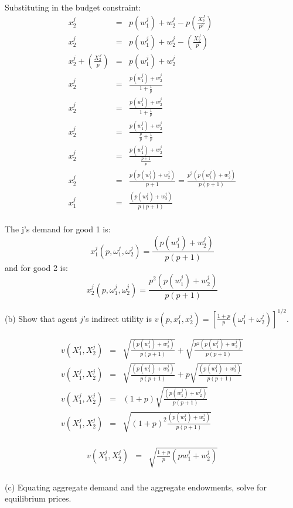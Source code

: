 Substituting in the budget constraint:
\begin{eqnarray*}
x_2^j&=&p(w_1^j)+w_2^j-p(\frac{X_2^J}{p^2})\\
x_2^j&=&p(w_1^j)+w_2^j-(\frac{X_2^J}{p})\\
x_2^j+(\frac{X_2^J}{p})&=&p(w_1^j)+w_2^j\\
x_2^j&=&\frac{p(w_1^j)+w_2^j}{1+\frac{1}{p}}\\
x_2^j&=&\frac{p(w_1^j)+w_2^j}{1+\frac{1}{p}}\\
x_2^j&=&\frac{p(w_1^j)+w_2^j}{\frac{p}{p}+\frac{1}{p}}\\
x_2^j&=&\frac{p(w_1^j)+w_2^j}{\frac{p+1}{p}}\\
x_2^j&=&\frac{p(p(w_1^j)+w_2^j)}{p+1}=\frac{p^2(p(w_1^j)+w_2^j)}{p(p+1)}\\
x_1^j&=&\frac{(p(w_1^j)+w_2^j)}{p(p+1)}\\
\end{eqnarray*}

\begin{myanswerbox}
    The j's demand for good 1 is:
    \[ x^j_1(p, \omega^j_1, \omega^j_2) = \frac{(p(w_1^j)+w_2^j)}{p(p+1)} \] and for good 2 is: 
    \[ x^j_2(p, \omega^j_1, \omega^j_2) = \frac{p^2(p(w_1^j)+w_2^j)}{p(p+1)} \]
\end{myanswerbox}

\begin{tcolorbox}
    (b) Show that agent \( j \)'s indirect utility is \( v(p, x^j_1, x^j_2) = \left[ \frac{1+p}{p} (\omega^j_1 + \omega^j_2) \right]^{1/2} \).
\end{tcolorbox}

\begin{eqnarray*}
v(X_1^j,X_2^j)&=&\sqrt{\frac{(p(w_1^j)+w_2^j)}{p(p+1)}}+\sqrt{\frac{p^2(p(w_1^j)+w_2^j)}{p(p+1)}}\\
v(X_1^j,X_2^j)&=&\sqrt{\frac{(p(w_1^j)+w_2^j)}{p(p+1)}}+p\sqrt{\frac{(p(w_1^j)+w_2^j)}{p(p+1)}}\\
v(X_1^j,X_2^j)&=&(1+p)\sqrt{\frac{(p(w_1^j)+w_2^j)}{p(p+1)}}\\
v(X_1^j,X_2^j)&=&\sqrt{(1+p)^2\frac{(p(w_1^j)+w_2^j)}{p(p+1)}}\\
\end{eqnarray*}

\begin{myanswerbox}
    \begin{eqnarray*}
    v(X_1^j,X_2^j)&=&\sqrt{\frac{1+p}{p}(pw_1^j+w_2^j)}\\
    \end{eqnarray*}
\end{myanswerbox}
\begin{tcolorbox}
    (c) Equating aggregate demand and the aggregate endowments, solve for equilibrium prices.
\end{tcolorbox}

